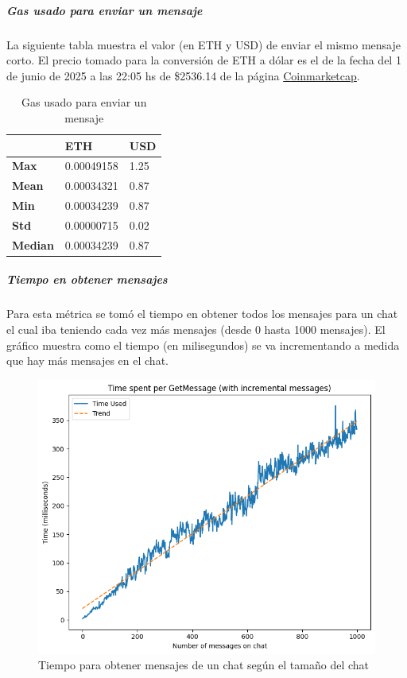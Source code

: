 \subparagraph{Gas usado para enviar un mensaje}

La siguiente tabla muestra el valor (en ETH y USD) de enviar el mismo mensaje corto. El precio tomado para la conversión de ETH a dólar es el de la fecha del 1 de junio de 2025 a las 22:05 hs de \$2536.14 de la página \href{https://coinmarketcap.com/currencies/ethereum/}{Coinmarketcap}.

\setlength\tabcolsep{1pt}
\begin{table}[!htbp]
    \centering
    \begin{tabular}{|m{5em}|m{6em}|m{3em}|}
    \hline
    & ETH & USD \\
    \hline
    \textbf{Max} & 0.00049158 & 1.25 \\
    \hline
    \textbf{Mean} & 0.00034321 & 0.87 \\
    \hline
    \textbf{Min} & 0.00034239 & 0.87 \\
    \hline
    \textbf{Std} & 0.00000715 & 0.02 \\
    \hline
    \textbf{Median} & 0.00034239 & 0.87 \\
    \hline
    \end{tabular}
    \caption{Gas usado para enviar un mensaje}
\end{table}

\subparagraph{Tiempo en obtener mensajes}

Para esta métrica se tomó el tiempo en obtener todos los mensajes para un chat el cual iba teniendo cada vez más mensajes (desde 0 hasta 1000 mensajes). El gráfico muestra como el tiempo (en milisegundos) se va incrementando a medida que hay más mensajes en el chat.

\begin{figure}[h!]
    \centering
    \includegraphics[width=1\linewidth]{img/blockchain-get-message-graphic.png}
    \caption{Tiempo para obtener mensajes de un chat según el tamaño del chat}
    \label{fig:blockchain-get-message-graphic.png}
\end{figure}

